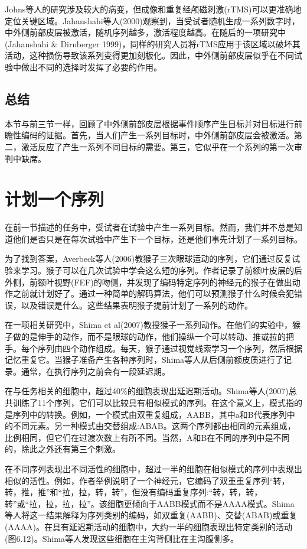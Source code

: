 Johns等人的研究涉及较大的病变，但成像和重复经颅磁刺激(rTMS)可以更准确地定位关键区域。Jahanshahi等人(2000)观察到，当受试者随机生成一系列数字时，中外侧前部皮层被激活，随机序列越多，激活程度越高。在随后的一项研究中(Jahanshahi \& Dirnberger 1999)，同样的研究人员将rTMS应用于该区域以破坏其活动，这种损伤导致该系列变得更加刻板化。因此，中外侧前部皮层似乎在不同试验中做出不同的选择时发挥了必要的作用。

\subsection{总结}
本节与前三节一样，回顾了中外侧前部皮层根据事件顺序产生目标并对目标进行前瞻性编码的证据。首先，当人们产生一系列目标时，中外侧前部皮层会被激活。第二，激活反应了产生一系列不同目标的需要。第三，它似乎在一个系列的第一次审判中缺席。

\section{计划一个序列}
在前一节描述的任务中，受试者在试验中产生一系列目标。然而，我们并不总是知道他们是否只是在每次试验中产生下一个目标，还是他们事先计划了一系列目标。

为了找到答案，Averbeck等人(2006)教猴子三次眼球运动的序列，它们通过反复试验来学习。猴子可以在几次试验中学会这么短的序列。作者记录了前额叶皮层的后外侧，前额叶视野(FEF)的吻侧，并发现了编码特定序列的神经元的猴子在做出动作之前就计划好了。通过一种简单的解码算法，他们可以预测猴子什么时候会犯错误，以及错误是什么。这些结果表明猴子提前计划了一系列的动作。

在一项相关研究中，Shima et al(2007)教授猴子一系列动作。在他们的实验中，猴子做的是伸手的动作，而不是眼球的动作，他们操纵一个可以转动、推或拉的把手。每个序列由四个动作组成。每天，猴子通过视觉线索学习一个序列，然后根据记忆重复它。当猴子准备产生各种序列时，Shima等人从后侧前额皮质进行了记录。通常，在执行序列之前会有一段延迟期。

在与任务相关的细胞中，超过40\%的细胞表现出延迟期活动。Shima等人(2007)总共训练了11个序列，它们可以比较具有相似模式的序列。在这个意义上，模式指的是序列中的转换。例如，一个模式由双重复组成，AABB，其中a和B代表序列中的不同元素。另一种模式由交替组成:ABAB。这两个序列都由相同的元素组成，比例相同，但它们在过渡次数上有所不同。当然，A和B在不同的序列中是不同的，除此之外还有第三个刺激。

在不同序列表现出不同活性的细胞中，超过一半的细胞在相似模式的序列中表现出相似的活性。例如，作者举例说明了一个神经元，它编码了双重重复序列“转，转，推，推”和“拉，拉，转，转”，但没有编码重复序列:“转，转，转，转”或“拉，拉，拉，拉”。该细胞更倾向于AABB模式而不是AAAA模式。Shima等人将这一结果解释为序列类别的编码，如双重复(AABB)、交替(ABAB)或重复(AAAA)。在具有延迟期活动的细胞中，大约一半的细胞表现出特定类别的活动(图6.12)。Shima等人发现这些细胞在主沟背侧比在主沟腹侧多。

